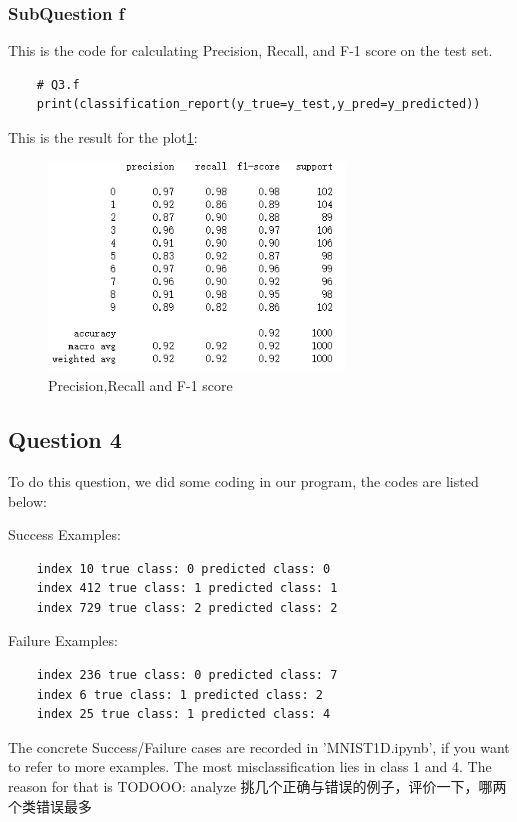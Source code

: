\documentclass[conference]{IEEEtran}
\begin{document}
\subsubsection{SubQuestion f}
This is the code for calculating Precision, Recall, and F-1 score on the test set.
\begin{lstlisting}
    # Q3.f
    print(classification_report(y_true=y_test,y_pred=y_predicted))
\end{lstlisting}
This is the result for the plot\ref{Fig.t1q3f}:
\begin{figure}[H] 
    \centering %
    \includegraphics[width=0.7\textwidth]{T1Q3f.png} %
    \caption{Precision,Recall and F-1 score} %
    \label{Fig.t1q3f} %
\end{figure}
\subsection{Question 4}
To do this question, we did some coding in our program, the codes are listed below:

Success Examples:
\begin{lstlisting}
    index 10 true class: 0 predicted class: 0
    index 412 true class: 1 predicted class: 1
    index 729 true class: 2 predicted class: 2
    \end{lstlisting}
Failure Examples:
\begin{lstlisting}
    index 236 true class: 0 predicted class: 7
    index 6 true class: 1 predicted class: 2
    index 25 true class: 1 predicted class: 4
\end{lstlisting}
The concrete Success/Failure cases are recorded in 'MNIST1D.ipynb', if you want to refer to more examples.
The most misclassification lies in class 1 and 4.
The reason for that is TODOOO: analyze
挑几个正确与错误的例子，评价一下，哪两个类错误最多
\end{document}
